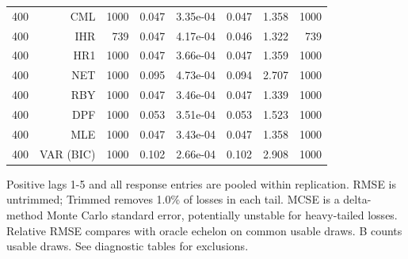 \begin{table}[p]
\begin{tabular}{rrrrrrrr}
400 & CML & 1000 & 0.047 & 3.35e-04 & 0.047 & 1.358 & 1000 \\
400 & IHR &  739 & 0.047 & 4.17e-04 & 0.046 & 1.322 &  739 \\
400 & HR1 & 1000 & 0.047 & 3.66e-04 & 0.047 & 1.359 & 1000 \\
400 & NET & 1000 & 0.095 & 4.73e-04 & 0.094 & 2.707 & 1000 \\
400 & RBY & 1000 & 0.047 & 3.46e-04 & 0.047 & 1.339 & 1000 \\
400 & DPF & 1000 & 0.053 & 3.51e-04 & 0.053 & 1.523 & 1000 \\
400 & MLE & 1000 & 0.047 & 3.43e-04 & 0.047 & 1.358 & 1000 \\
400 & VAR (BIC) & 1000 & 0.102 & 2.66e-04 & 0.102 & 2.908 & 1000 \\
\bottomrule\end{tabular}
\par\medskip
\begin{minipage}{0.98\linewidth}\footnotesize Positive lags 1-5 and all response entries are pooled within replication. RMSE is untrimmed; Trimmed removes 1.0\% of losses in each tail. MCSE is a delta-method Monte Carlo standard error, potentially unstable for heavy-tailed losses. Relative RMSE compares with oracle echelon on common usable draws. B counts usable draws. See diagnostic tables for exclusions.\end{minipage}
\end{table}
